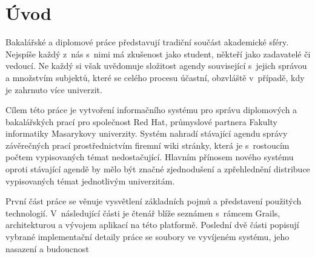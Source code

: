 \chapter{Úvod}
Bakalářské a diplomové práce představují tradiční součást akademické sféry. Nejspíše každý z~nás s~nimi má zkušenost jako student, někteří jako zadavatelé či vedoucí. Ne každý si však uvědomuje složitost agendy související s~jejich správou a množstvím subjektů, které se celého procesu účastní, obzvláště v~případě, kdy je zahrnuto více univerzit.


Cílem této práce je vytvoření informačního systému pro správu diplomových a bakalářských prací pro společnost Red Hat, průmyslové partnera Fakulty informatiky Masarykovy univerzity. Systém nahradí stávající agendu správy závěrečných prací prostřednictvím firemní wiki stránky, která je s~rostoucím počtem vypisovaných témat nedostačující. Hlavním přínosem nového systému oproti stávající agendě by mělo být značné zjednodušení a zpřehlednění distribuce vypisovaných témat jednotlivým univerzitám.


První část práce se věnuje vysvětlení základních pojmů a představení použitých technologií. V~následující části je čtenář blíže seznámen s~rámcem Grails, architekturou a vývojem aplikací na této platformě. Poslední dvě části popisují vybrané implementační detaily práce se soubory ve vyvíjeném systému, jeho nasazení a budoucnost

